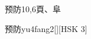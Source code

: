 \begin{entry}{预防}{10,6}{⾴、⾩}
  \begin{phonetics}{预防}{yu4fang2}[][HSK 3]
  \end{phonetics}
\end{entry}
